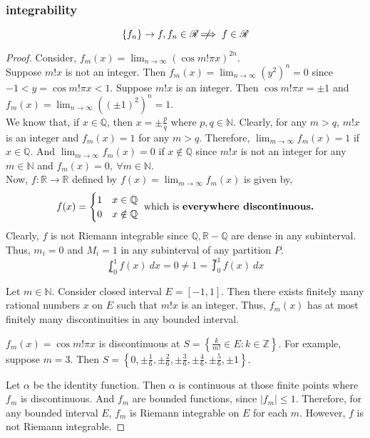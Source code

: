 \subsubsection{integrability} 
\[ \left\{f_n\right\} \to f, f_n \in \mathscr{R} \;\not\nobreak\!\!\!\!\implies f \in \mathscr{R} \]
\begin{proof}
Consider, $\displaystyle f_m(x) = \lim_{n \to \infty} (\cos m!\pi x)^{2n}$.\\

Suppose $m!x$ is not an integer.
Then $\displaystyle f_m(x) = \lim_{n \to \infty} (y^2)^n = 0$ since $-1<y = \cos m! \pi x <1$.
Suppose $m!x$ is an integer.
Then $\cos m! \pi x = \pm 1$ and $\displaystyle f_m(x) = \lim_{n \to \infty} ((\pm 1)^2)^n = 1$.\\

We know that, if $x \in \mathbb{Q}$, then $x = \pm \frac{p}{q}$ where $p,q \in \mathbb{N}$.
Clearly, for any $m > q$, $m! x$ is an integer and $f_m(x) =1 $ for any $m > q$.
Therefore, $\displaystyle \lim_{m \to \infty} f_m(x) = 1$ if $x \in \mathbb{Q}$.
And $\displaystyle \lim_{m \to \infty} f_m(x) = 0$ if $x \notin \mathbb{Q}$ since $m! x$ is not an integer for any $m \in \mathbb{N}$ and $f_m(x) = 0,\ \forall m \in \mathbb{N}$.\\

Now, $f : \mathbb{R} \to \mathbb{R}$ defined by $\displaystyle f(x) = \lim_{m \to \infty} f_m(x)$ is given by,
	\[ f(x) = \begin{cases} 1 & x \in \mathbb{Q} \\ 0 & x \notin \mathbb{Q} \end{cases} \text{ which is \textbf{everywhere discontinuous.}} \]
	Clearly, $f$ is not Riemann integrable since $\mathbb{Q}, \mathbb{R}-\mathbb{Q}$ are dense in any subinterval.
	Thus, $m_i = 0$ and $M_i = 1$ in any subinterval of any partition $P$.
	\[ \lowint_0^1 f(x)\ dx = 0 \ne 1 = \upint_0^1 f(x)\ dx \]

\begin{important}
Let $m \in \mathbb{N}$.
Consider closed interval $E = [-1,1]$.
Then there exists finitely many rational numbers $x$ on $E$ such that $m!x$ is an integer.
Thus, $f_m(x)$ has at most finitely many discontinuities in any bounded interval. 
\end{important}
\begin{commentary}
$f_m(x) = \cos m! \pi x$ is discontinuous at $S = \left\{ \frac{k}{m!} \in E : k \in \mathbb{Z} \right\}$.
For example, suppose $m = 3$.
Then $S = \left\{ 0,\pm\frac{1}{6},\pm\frac{2}{6},\pm\frac{3}{6},\pm\frac{4}{6},\pm\frac{5}{6},\pm 1 \right\}$.
\end{commentary}
Let $\alpha$ be the identity function.
Then $\alpha$ is continuous at those finite points where $f_m$ is discontinuous.
And $f_m$ are bounded functions, since $|f_m| \le 1$.
Therefore, for any bounded interval $E$, $f_m$ is Riemann integrable on $E$ for each $m$.
However, $f$ is not Riemann integrable.
\end{proof}
